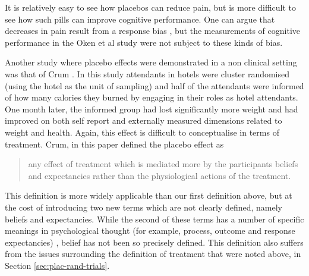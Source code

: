 It is relatively easy to see how placebos can reduce pain, but is more difficult to see how such pills can improve cognitive performance. One can argue that decreases in pain result from a response bias \cite{Allan2002}, but the measurements of cognitive performance in the Oken et al study were not subject to these kinds of bias. 




Another study where placebo effects were demonstrated in a non clinical setting was that of Crum \cite{Crum2007}. In this study attendants in hotels were cluster randomised (using the hotel as the unit of sampling) and half of the attendants were informed of how many calories they burned by engaging in their roles as hotel attendants. One month later, the informed group had lost significantly more weight and had improved on both self report and externally measured dimensions related to weight and health. Again, this effect is difficult to conceptualise in terms of treatment.  Crum, in this paper defined the placebo effect as

\begin{quotation}
  any effect of treatment which is mediated more by the participants
  beliefs and expectancies rather than the physiological actions of
  the treatment.
\end{quotation}

This definition is more widely applicable than our first definition above, but at the cost of introducing two new terms which are not clearly defined, namely beliefs and expectancies. While the second of these terms has a number of specific meanings in psychological thought (for example, process, outcome and response expectancies) \cite{Bandura1977,Kirsch1985}, belief has not been so precisely defined. This definition also suffers from the issues surrounding the definition of treatment that were noted above, in Section \ref{sec:plac-rand-trials}. 



